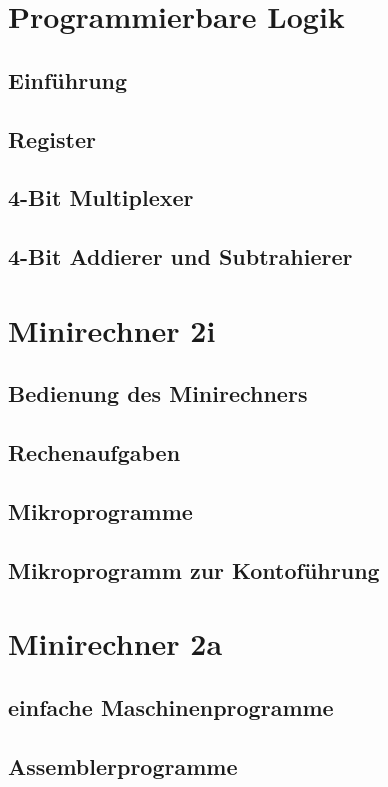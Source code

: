 \documentclass[paper=a4, fontsize=11pt]{scrartcl}
\numberwithin{equation}{section}
\numberwithin{figure}{section}
\numberwithin{table}{section}
\begin{document}

\newpage

\section{Programmierbare Logik}

\subsection{Einführung}

\subsection{Register}

\subsection{4-Bit Multiplexer}

\subsection{4-Bit Addierer und Subtrahierer}


\newpage

\section{Minirechner 2i}

\subsection{Bedienung des Minirechners}

\subsection{Rechenaufgaben}

\subsection{Mikroprogramme}

\subsection{Mikroprogramm zur Kontoführung}


\newpage

\section{Minirechner 2a}

\subsection{einfache Maschinenprogramme}

\subsection{Assemblerprogramme}
\end{document}
